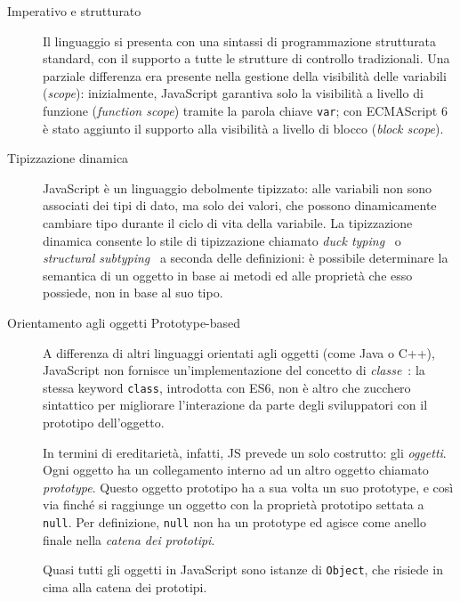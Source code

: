       \begin{description}
        \item[Imperativo e strutturato]
          Il linguaggio si presenta con una sintassi di programmazione strutturata standard, con il supporto a tutte le strutture di controllo tradizionali.
          Una parziale differenza era presente nella gestione della visibilità delle variabili (\emph{scope}):
          inizialmente, JavaScript garantiva solo la visibilità a livello di funzione (\emph{function scope}) tramite la parola chiave \texttt{var};
          con ECMAScript 6 è stato aggiunto il supporto alla visibilità a livello di blocco (\emph{block scope}).

        \item[Tipizzazione dinamica]
          JavaScript è un linguaggio debolmente tipizzato:
          alle variabili non sono associati dei tipi di dato, ma solo dei valori, che possono dinamicamente cambiare tipo durante il ciclo di vita della variabile.
          La tipizzazione dinamica consente lo stile di tipizzazione chiamato \emph{duck typing}~\cite{10.1145/2103621.2103686} o \emph{structural subtyping}~\cite{10.1145/3022671.2984017} a seconda delle definizioni:
          è possibile determinare la semantica di un oggetto in base ai metodi ed alle proprietà che esso possiede, non in base al suo tipo.

        \item[Orientamento agli oggetti Prototype-based]
          A differenza di altri linguaggi orientati agli oggetti (come Java o C++), JavaScript non fornisce un'implementazione del concetto di \emph{classe}~\cite{Ungar1991}:
          la stessa keyword \texttt{class}, introdotta con ES6, non è altro che zucchero sintattico per migliorare l'interazione da parte degli sviluppatori con il prototipo dell'oggetto.

          In termini di ereditarietà, infatti, JS prevede un solo costrutto: gli \emph{oggetti}.
          Ogni oggetto ha un collegamento interno ad un altro oggetto chiamato \emph{prototype}.
          Questo oggetto prototipo ha a sua volta un suo prototype, e così via finché si raggiunge un oggetto con la proprietà prototipo settata a \texttt{null}.
          Per definizione, \texttt{null} non ha un prototype ed agisce come anello finale nella \emph{catena dei prototipi}.

          Quasi tutti gli oggetti in JavaScript sono istanze di \texttt{Object}, che risiede in cima alla catena dei prototipi.


\end{description}
